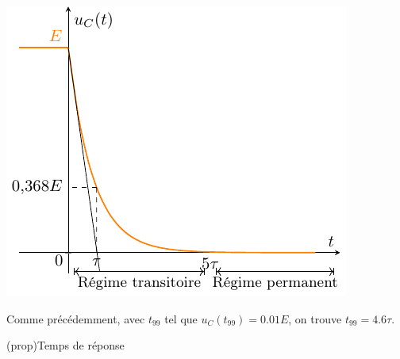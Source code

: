 \documentclass[../../main/main.tex]{subfiles}
\begin{document}
\begin{tcbraster}[raster columns=2, raster equal height=rows]
\begin{tcb}
{			\includegraphics[width=\linewidth]{carac_rc-tau_decharge}
		}
	\end{tcb}
\end{tcbraster}
Comme précédemment, avec $t_{99}$ tel que $u_C(t_{99}) = \num{0.01}E$, on
trouve $t_{99} = \num{4.6}\tau$.
\begin{tcb}(prop){Temps de réponse}
	{}
\end{tcb}
\end{document}
